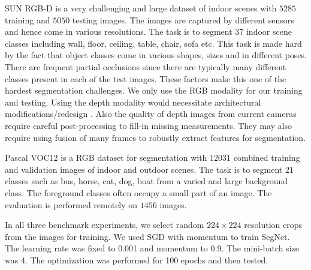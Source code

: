 SUN RGB-D \citep{song2015sun} is a very challenging and large dataset of indoor scenes with $5285$ training and $5050$ testing images. The images are captured by different sensors and hence come in various resolutions. The task is to segment $37$ indoor scene classes including wall, floor, ceiling, table, chair, sofa etc. This task is made hard by the fact that object classes come in various shapes, sizes and in different poses. There are frequent partial occlusions since there are typically many different classes present in each of the test images. These factors make this one of the hardest segmentation challenges. We only use the RGB modality for our training and testing. Using the depth modality would necessitate architectural modifications/redesign \citep{long2015fully}. Also the quality of depth images from current cameras require careful post-processing to fill-in missing measurements. They may also require using fusion of many frames to robustly extract features for segmentation.

Pascal VOC12 \citep{pascal} is a RGB dataset for segmentation with $12031$ combined training and validation images of indoor and outdoor scenes. The task is to segment $21$ classes such as bus, horse, cat, dog, boat from a varied and large background class. The foreground classes often occupy a small part of an image. The evaluation is performed remotely on $1456$ images.

In all three benchmark experiments, we select random $224\times224$ resolution crops from the images for training. We used SGD with momentum to train SegNet. The learning rate was fixed to 0.001 and momentum to 0.9. The mini-batch size was 4. The optimization was performed for 100 epochs and then tested.

